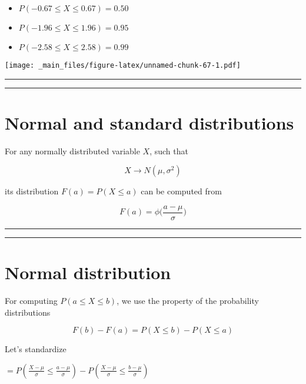 \documentclass[
]{book}
\providecommand{\tightlist}{%
  \setlength{\itemsep}{0pt}\setlength{\parskip}{0pt}}
\begin{document}
\begin{itemize}
\tightlist
\item
  \(P(-0.67 \leq X \leq 0.67)=0.50\)
\item
  \(P(-1.96 \leq X \leq 1.96)=0.95\)
\item
  \(P(-2.58 \leq X \leq 2.58)=0.99\)
\end{itemize}

\texttt{[image: \_main\_files/figure-latex/unnamed-chunk-67-1.pdf]}

\begin{center}\rule{0.5\linewidth}{0.5pt}\end{center}

\begin{center}\rule{0.5\linewidth}{0.5pt}\end{center}

\hypertarget{normal-and-standard-distributions}{%
\section{Normal and standard distributions}\label{normal-and-standard-distributions}}

For any normally distributed variable \(X\), such that

\[X\rightarrow N(\mu, \sigma^2)\]

its distribution \(F(a)=P(X \leq a)\) can be computed from

\[F(a)= \phi \big(\frac{a-\mu}{\sigma}\big)\]

\begin{center}\rule{0.5\linewidth}{0.5pt}\end{center}

\begin{center}\rule{0.5\linewidth}{0.5pt}\end{center}

\hypertarget{normal-distribution-7}{%
\section{Normal distribution}\label{normal-distribution-7}}

For computing \(P(a\leq X \leq b)\), we use the property of the probability distributions

\[F(b)-F(a)=P(X\leq b)-P(X\leq a)\]

Let's standardize

\(=P(\frac{X-\mu}{\sigma}\leq \frac{a-\mu}{\sigma})-P(\frac{X-\mu}{\sigma}\leq \frac{b-\mu}{\sigma})\)
\end{document}
